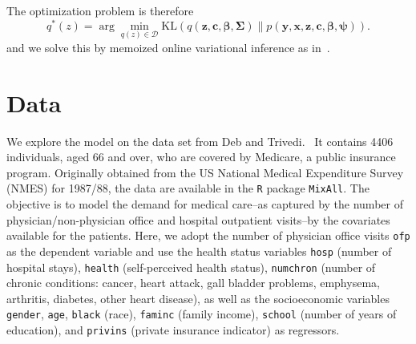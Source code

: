 \documentclass[a4paper,UKenglish]{oasics-v2016}
\begin{document}
The optimization problem is therefore
$$
q^*(z)=\arg\underset{q(z)\in \mathcal{D}} \min \mathrm{KL}(q(\mathbf{z},\mathbf{c},\boldsymbol{\beta},\boldsymbol{\Sigma})\|p(\mathbf{y},\mathbf{x},\mathbf{z},\boldsymbol{c},\boldsymbol{\beta},\boldsymbol{\psi})).
$$
and we solve this by memoized online variational inference as in~\cite{movi}.%


\section{Data}
We explore the model on the data set from Deb and Trivedi.~\cite{DebTrivedi}
It contains 4406 individuals, aged 66 and over, who are covered
by Medicare, a public insurance program. Originally obtained from the US National Medical
Expenditure Survey (NMES) for 1987/88, the data are available in the \texttt{R} package \texttt{MixAll}. 
The objective is to model the demand for medical care--as captured by the
number of physician/non-physician office and hospital outpatient visits--by the covariates
available for the patients. Here, we adopt the number of physician office visits \texttt{ofp} as the
dependent variable and use the health status variables \texttt{hosp} (number of hospital stays), \texttt{health}
(self-perceived health status), \texttt{numchron} (number of chronic conditions: cancer, heart attack, gall bladder problems, emphysema, arthritis, diabetes, other heart disease), as well as the socioeconomic
variables \texttt{gender}, \texttt{age}, \texttt{black} (race), \texttt{faminc} (family income), \texttt{school} (number of years of education), and \texttt{privins} (private insurance indicator) as regressors.
\end{document}
